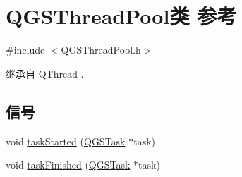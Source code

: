 \hypertarget{class_q_g_s_thread_pool}{}\section{Q\+G\+S\+Thread\+Pool类 参考}
\label{class_q_g_s_thread_pool}


{\ttfamily \#include $<$Q\+G\+S\+Thread\+Pool.\+h$>$}



继承自 Q\+Thread .

\subsection*{信号}
\begin{DoxyCompactItemize}
\item 
void \mbox{\hyperlink{class_q_g_s_thread_pool_a77cbc788b1b7b7be3d031f3a734f0c0b}{task\+Started}} (\mbox{\hyperlink{class_q_g_s_task}{Q\+G\+S\+Task}} $\ast$task)
\item 
void \mbox{\hyperlink{class_q_g_s_thread_pool_a3148d326fe67fee92958522e66a2c61b}{task\+Finished}} (\mbox{\hyperlink{class_q_g_s_task}{Q\+G\+S\+Task}} $\ast$task)
\end{DoxyCompactItemize}
